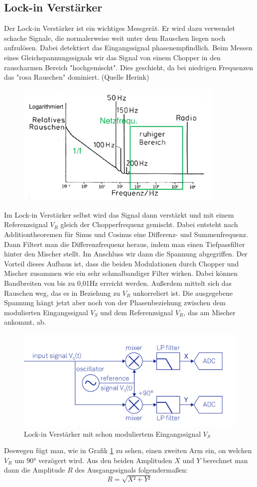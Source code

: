 
\subsection{Lock-in Verstärker}

Der Lock-in Verstärker ist ein wichtiges Messgerät. Er wird dazu verwendet schache Signale, die normalerweise weit unter dem Rauschen liegen noch aufzulösen.
Dabei detektiert das Eingangssignal phasenempfindlich. Beim Messen eines Gleichspannungssignals wir das Signal von einem Chopper in den rauscharmen Bereich "hochgemischt". 
Dies geschieht, da bei niedrigen Frequenzen das "rosa Rauschen" dominiert. (Quelle Herink) 

\begin{figure}[h]
    \centering
    \includegraphics[width = 10cm ]{Bilder/Rauschen.png}
\end{figure}
Im Lock-in Verstärker selbst wird das Signal dann verstärkt und mit einem Referenzsignal $V_R$ gleich der Chopperfrequenz gemischt. Dabei entsteht nach Additiontheoremen für Sinus und Cosinus eine
Differenz- und Summenfrequenz. Dann Filtert man die Differenzfrequenz heraus, indem man einen Tiefpassfilter hinter den Mischer stellt. Im Anschluss wir dann die Spannung abgegriffen. 
Der Vorteil dieses Aufbaus ist, dass die beiden Modulationen durch Chopper und Mischer zusammen wie ein sehr schmalbandiger Filter wirken. Dabei können Bandbreiten von bis zu 0,01Hz erreicht werden. 
Außerdem mittelt sich das Rauschen weg, das es in Beziehung zu $V_R$ unkorreliert ist. Die ausgegebene Spannung hängt jetzt aber noch von der Phasenbeziehung zwischen dem 
modulierten Eingangssignal $V_S$ und dem Referenzsignal $V_R$, das am Mischer ankommt, ab.
\begin{figure}[ht]
    \centering
    \includegraphics[width = 12cm]{Bilder/Lockin.png}
    \caption{Lock-in Verstärker mit schon moduliertem Eingangssignal $V_S$}
    \label{lockin}
\end{figure}
 Deswegen fügt man, wie in Grafik \ref{lockin} zu sehen, einen zweiten Arm ein, on welchen $V_R$ 
um 90° verzögert wird. Aus den beiden Amplituden $X$ und $Y$ berechnet man dann die Amplitude $R$ des Ausgangssignals folgendermaßen:
\begin{equation*}
    R = \sqrt{X²+Y²}
\end{equation*}
  


